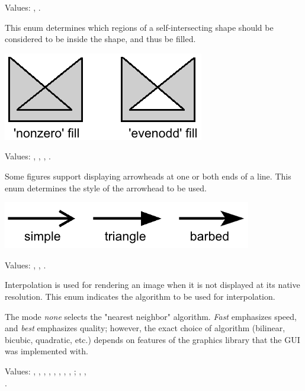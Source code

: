 
Values: , .

This enum determines which regions of a self-intersecting shape
should be considered to be inside the shape, and thus be filled.

\begin{center}
\includegraphics[scale=0.8]{figures/graphics-fillrule}
\end{center}


Values: , , , .

Some figures support displaying arrowheads at one or both ends of a line.
This enum determines the style of the arrowhead to be used.

\begin{center}
\includegraphics[scale=0.8]{figures/graphics-arrowheads}
\end{center}


Values: , , .

Interpolation is used for rendering an image when it is not displayed at
its native resolution. This enum indicates the algorithm to be used for
interpolation.

The mode \textit{none} selects the "nearest neighbor" algorithm.
\textit{Fast} emphasizes speed, and \textit{best} emphasizes quality;
however, the exact choice of algorithm (bilinear, bicubic, quadratic, etc.)
depends on features of the graphics library that the GUI was implemented with.


Values:
, , , , ,
, , , ;
, , \\ .

